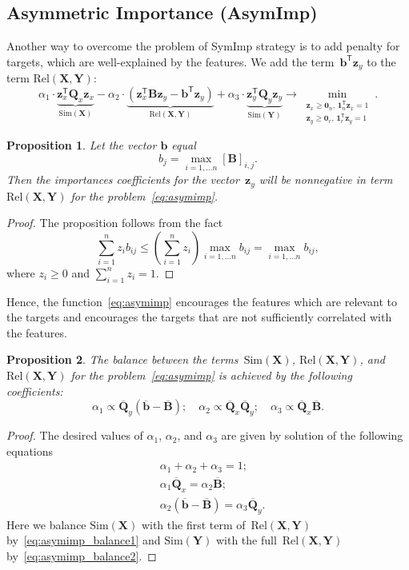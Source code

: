 \documentclass[12pt,twoside]{article}
\newtheorem{proposition}{Proposition}
\theoremstyle{definition}
\newcommand{\bz}{\mathbf{z}}
\newcommand{\bb}{\mathbf{b}}
\newcommand{\bY}{\mathbf{Y}}
\newcommand{\bX}{\mathbf{X}}
\newcommand{\bB}{\mathbf{B}}
\newcommand{\bQ}{\mathbf{Q}}
\newcommand{\T}{\mathsf{T}}
\newcommand{\bOne}{\boldsymbol{1}}
\newcommand{\bZero}{\boldsymbol{0}}
\begin{document}
\subsection{Asymmetric Importance (AsymImp)}
Another way to overcome the problem of SymImp strategy is to add penalty for targets, which are well-explained by the features.
We add the term~$\bb^{\T} \bz_y$ to the term $\text{Rel}(\bX, \bY)$:
\begin{equation}
\alpha_1 \cdot \underbrace{\bz_x^{\T} \bQ_x \bz_x}_{\text{Sim}(\bX)} - \alpha_2 \cdot  \underbrace{\left(\bz_x^{\T} \bB \bz_y - \bb^{\T} \bz_y \right) }_{\text{Rel}(\bX, \bY)} + \alpha_3 \cdot \underbrace{\bz_y^{\T} \bQ_y \bz_y}_{\text{Sim}(\bY)} \rightarrow \min_{\substack{\bz_x \geq \bZero_n, \, \bOne_n^{\T}\bz_x=1 \\ \bz_y \geq \bZero_r, \, \bOne_r^{\T}\bz_y=1}}.
\label{eq:asymimp}
\end{equation}
\begin{proposition}
	Let the vector $\bb$ equal
	\begin{equation*}
	b_j = \max_{i=1, \dots n} [\bB]_{i, j}.
	\end{equation*}
	Then the importances coefficients for the vector~$\bz_y$ will be nonnegative in term~$\text{Rel}(\bX, \bY)$ for the problem~\eqref{eq:asymimp}.
\end{proposition}
\begin{proof}
	The proposition follows from the fact 
	\[
	\sum_{i=1}^n  z_i b_{ij} \leq \left(\sum_{i=1}^n z_i \right)\max_{i=1, \dots n} b_{ij} = \max_{i=1, \dots n} b_{ij},
	\]
	where $z_i \geq 0$ and $\sum_{i=1}^nz_i = 1$.
\end{proof}
Hence, the function~\eqref{eq:asymimp} encourages the features which are relevant to the targets and encourages the targets that are not sufficiently correlated with the features. 
\begin{proposition}
	The balance between the terms~$\text{Sim}(\bX)$, $\text{Rel}(\bX, \bY)$, and $\text{Rel}(\bX, \bY)$ for the problem~\eqref{eq:asymimp} is achieved by the following coefficients:
	\begin{equation*}
	\alpha_1 \propto \overline{\bQ}_y \left( \overline{\bb} - \overline{\bB}\right); \quad
	\alpha_2 \propto \overline{\bQ}_x \overline{\bQ}_y; \quad
	\alpha_3  \propto \overline{\bQ}_x \overline{\bB}.
	\end{equation*}
\end{proposition}
\begin{proof}
	The desired values of $\alpha_1$, $\alpha_2$, and $\alpha_3$ are given by solution of the following equations
	\begin{align}
	&\alpha_1 + \alpha_2 + \alpha_3 = 1; \\
	&\alpha_1 \overline{\bQ}_x = \alpha_2 \overline{\bB}; \label{eq:asymimp_balance1}\\
	&\alpha_2 \left(\overline{\bb} - \overline{\bB} \right) = \alpha_3 \overline{\bQ}_y.
	\label{eq:asymimp_balance2}
	\end{align}
	Here we balance $\text{Sim}(\bX)$ with the first term of~$\text{Rel}(\bX, \bY)$ by~\eqref{eq:asymimp_balance1} and $\text{Sim}(\bY)$ with the full~$\text{Rel}(\bX, \bY)$ by~\eqref{eq:asymimp_balance2}.
\end{proof}
\end{document}
